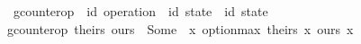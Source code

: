 \begin{isabellebody}%
\isamarkupfalse%
\ gcounter{\isacharunderscore}op\ {\isacharcolon}{\isacharcolon}\ {\isachardoublequoteopen}{\isacharparenleft}{\isacharprime}id\ operation{\isacharparenright}\ {\isasymRightarrow}\ {\isacharparenleft}{\isacharprime}id\ state{\isacharparenright}\ {\isasymrightharpoonup}\ {\isacharparenleft}{\isacharprime}id\ state{\isacharparenright}{\isachardoublequoteclose}\ \isanewline
{\isachardoublequoteopen}gcounter{\isacharunderscore}op\ theirs\ ours\ {\isacharequal}\ Some\ {\isacharparenleft}{\isasymlambda}\ x{\isachardot}\ option{\isacharunderscore}max\ {\isacharparenleft}theirs\ x{\isacharparenright}\ {\isacharparenleft}ours\ x{\isacharparenright}{\isacharparenright}{\isachardoublequoteclose}\isanewline
\end{isabellebody}
\endinput
